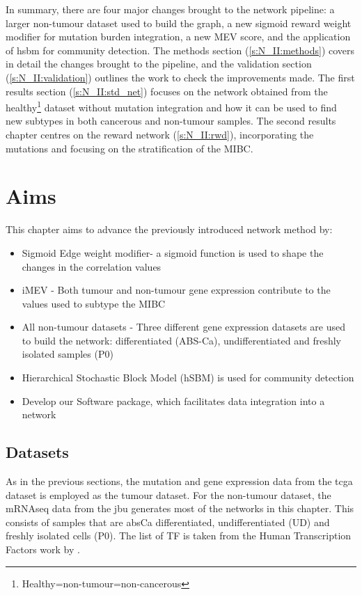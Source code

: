 In summary, there are four major changes brought to the network pipeline: a larger non-tumour dataset used to build the graph, a new sigmoid reward weight modifier for mutation burden integration, a new MEV score, and the application of \acrfull{hsbm} for community detection. The methods section (\ref{s:N_II:methods}) covers in detail the changes brought to the pipeline, and the validation section (\ref{s:N_II:validation}) outlines the work to check the improvements made. The first results section (\cref{s:N_II:std_net}) focuses on the network obtained from the healthy\footnote{Healthy=non-tumour=non-cancerous} dataset without mutation integration and how it can be used to find new subtypes in both cancerous and non-tumour samples. The second results chapter centres on the reward network (\ref{s:N_II:rwd}), incorporating the mutations and focusing on the stratification of the MIBC.


\section{Aims}

This chapter aims to advance the previously introduced network method by:
\begin{itemize}
    \item Sigmoid Edge weight modifier- a sigmoid function is used to shape the changes in the correlation values
    \item iMEV - Both tumour and non-tumour gene expression contribute to the values used to subtype the MIBC
    \item All non-tumour datasets - Three different gene expression datasets are used to build the network: differentiated (ABS-Ca), undifferentiated and freshly isolated samples (P0)
    \item Hierarchical Stochastic Block Model (hSBM) is used for community detection
    \item Develop our Software package, which facilitates data integration into a network
\end{itemize}

\subsection*{Datasets}

As in the previous sections, the mutation and gene expression data from the \acrshort{tcga} dataset is employed as the tumour dataset. For the non-tumour dataset, the mRNAseq data from the \acrfull{jbu} generates most of the networks in this chapter. This consists of samples that are \acrfull{absCa} differentiated, undifferentiated (UD) and freshly isolated cells (P0). The list of TF is taken from the Human Transcription Factors work by \citet{Lambert2018-el}.

